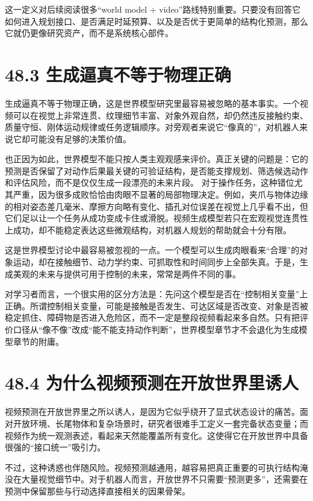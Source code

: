 这一定义对后续阅读很多“world model + video”路线特别重要。只要没有回答它如何进入规划接口、是否满足时延预算、以及是否优于更简单的结构化预测，那么它就仍更像研究资产，而不是系统核心部件。

\section*{48.3 生成逼真不等于物理正确}


生成逼真不等于物理正确，这是世界模型研究里最容易被忽略的基本事实。一个视频可以在视觉上非常连贯、纹理细节丰富、对象外观自然，却仍然违反接触约束、质量守恒、刚体运动规律或任务逻辑顺序。对旁观者来说它“像真的”，对机器人来说它却可能没有足够的决策价值。

也正因为如此，世界模型不能只按人类主观观感来评价。真正关键的问题是：它的预测是否保留了对动作后果最关键的可验证结构，是否能支撑规划、筛选候选动作和评估风险，而不是仅仅生成一段漂亮的未来片段。 对于操作任务，这种错位尤其严重，因为很多成败恰恰由肉眼不显著的局部物理决定。例如，夹爪与物体边缘的相对姿态差几毫米、摩擦方向略有变化、插孔对位误差在视觉上几乎看不出，但它们足以让一个任务从成功变成卡住或滑脱。视频生成模型若只在宏观视觉连贯性上成功，却不能稳定表达这些微观结构，对机器人规划的帮助就会十分有限。

这是世界模型讨论中最容易被忽视的一点。一个模型可以生成肉眼看来“合理”的对象运动，却在接触细节、动力学约束、可抓取性和时间同步上全部失真。于是，生成美观的未来与提供可用于控制的未来，常常是两件不同的事。

对学习者而言，一个很实用的区分方法是：先问这个模型是否在“控制相关变量”上正确。所谓控制相关变量，可能是接触是否发生、可达区域是否改变、对象是否被稳定抓住、障碍物是否进入危险区，而不一定是整段视频看起来多自然。只有把评价口径从“像不像”改成“能不能支持动作判断”，世界模型章节才不会退化为生成模型章节的附庸。

\section*{48.4 为什么视频预测在开放世界里诱人}


视频预测在开放世界里之所以诱人，是因为它似乎绕开了显式状态设计的痛苦。面对开放环境、长尾物体和复杂场景时，研究者很难手工定义一套完备状态变量；而视频作为统一观测表述，看起来天然能覆盖所有变化。这使得它在开放世界中具备很强的“接口统一”吸引力。

不过，这种诱惑也伴随风险。视频预测越通用，越容易把真正重要的可执行结构淹没在大量视觉细节中。对于机器人而言，开放世界不只需要“预测更多”，还需要在预测中保留那些与行动选择直接相关的因果骨架。

